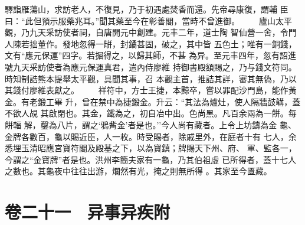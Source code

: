 \documentclass{ctexart}
\begin{document}
驛詣雁蕩山，求訪老人，不復見，乃于初遇處焚香而還。先帝尋康復，謂輔 臣曰：``此但預示服藥兆耳。''聞其藥至今在彰善閣，當時不曾進御。 　　廬山太平觀，乃九天采訪使者祠，自唐開元中創建。元丰二年，道士陶 智仙營一舍，令門人陳若拙董作。發地忽得一缾，封鐍甚固，破之，其中皆 五色土；唯有一銅錢，文有``應元保運''四字。若掘得之，以歸其師，不甚 為异。至元丰四年，忽有詔進號九天采訪使者為應元保運真君，遣內侍廖維 持御書殿額賜之，乃与錢文符同。時知制誥熊本提舉太平觀，具聞其事，召 本觀主首，推詰其詳，審其無偽，乃以其錢付廖維表獻之。 　　祥符中，方士王捷，本黥卒，嘗以罪配沙門島，能作黃金。有老鍛工畢 升，曾在禁中為捷鍛金。升云：``其法為爐灶，使人隔牆鼓韝，蓋不欲人覘 其啟閉也。其金，鐵為之，初自冶中出。色尚黑。凡百余兩為一餅。每餅輻 解，鑿為八片，謂之`鴉觜金'者是也。''今人尚有藏者。上令上坊鑄為金 龜、金牌各數百，龜以賜近臣，人一枚。時受賜者，除戚里外，在庭者十有 七人，余悉埋玉清昭應宮寶符閣及殿基之下，以為寶鎮；牌賜天下州、府、 軍、監各一，今謂之``金寶牌''者是也。洪州李簡夫家有一龜，乃其伯祖虛 已所得者，蓋十七人之數也。其龜夜中往往出游，爛然有光，掩之則無所得 。其家至今匱藏。
\clearpage
\section{卷二十一　异事异疾附}
\end{document}
